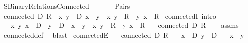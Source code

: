 %
\begin{isabellebody}%
%
%
\isadelimdocument
%
\endisadelimdocument
%
\isatagdocument
%
\isamarkuptrue%
%
\endisatagdocument
{\isafolddocument}%
%
\isadelimdocument
%
\endisadelimdocument
%
\isadelimtheory
%
\endisadelimtheory
%
\isatagtheory
{}\isamarkupfalse%
\ SBinary{\isacharunderscore}{\kern0pt}Relations{\isacharunderscore}{\kern0pt}Connected\isanewline
\ \ \isanewline
\ \ \ \ Pairs\isanewline
{}%
\endisatagtheory
{\isafoldtheory}%
%
\isadelimtheory
\isanewline
%
\endisadelimtheory
\isanewline
{}\isamarkupfalse%
\ {\isachardoublequoteopen}connected\ D\ R\ {\isasymequiv}\ {\isasymforall}x\ y\ {\isasymin}\ D{\isachardot}{\kern0pt}\ x\ {\isasymnoteq}\ y\ {\isasymlongrightarrow}\ {\isasymlangle}x{\isacharcomma}{\kern0pt}\ y{\isasymrangle}\ {\isasymin}\ R\ {\isasymor}\ {\isasymlangle}y{\isacharcomma}{\kern0pt}\ x{\isasymrangle}\ {\isasymin}\ R{\isachardoublequoteclose}\isanewline
\isanewline
{}\isamarkupfalse%
\ connectedI\ {\isacharbrackleft}{\kern0pt}intro{\isacharbrackright}{\kern0pt}{\isacharcolon}{\kern0pt}\isanewline
\ \ \ {\isachardoublequoteopen}{\isasymAnd}x\ y{\isachardot}{\kern0pt}\ x\ {\isasymin}\ D\ {\isasymLongrightarrow}\ y\ {\isasymin}\ D\ {\isasymLongrightarrow}\ x\ {\isasymnoteq}\ y\ {\isasymLongrightarrow}\ {\isasymlangle}x{\isacharcomma}{\kern0pt}\ y{\isasymrangle}\ {\isasymin}\ R\ {\isasymor}\ {\isasymlangle}y{\isacharcomma}{\kern0pt}\ x{\isasymrangle}\ {\isasymin}\ R{\isachardoublequoteclose}\isanewline
\ \ \ {\isachardoublequoteopen}connected\ D\ R{\isachardoublequoteclose}\isanewline
%
\isadelimproof
\ \ %
\endisadelimproof
%
\isatagproof
{}\isamarkupfalse%
\ assms\ \isamarkupfalse%
\ connected{\isacharunderscore}{\kern0pt}def\ \isamarkupfalse%
\ blast%
\endisatagproof
{\isafoldproof}%
%
\isadelimproof
\isanewline
%
\endisadelimproof
\isanewline
{}\isamarkupfalse%
\ connectedE{\isacharcolon}{\kern0pt}\isanewline
\ \ \ {\isachardoublequoteopen}connected\ D\ R{\isachardoublequoteclose}\isanewline
\ \ \ {\isachardoublequoteopen}x\ {\isasymin}\ D{\isachardoublequoteclose}\ {\isachardoublequoteopen}y\ {\isasymin}\ D{\isachardoublequoteclose}\isanewline
\ \ \ {\isachardoublequoteopen}x\ {\isasymnoteq}\ y{\isachardoublequoteclose}\isanewline

\end{isabellebody}
